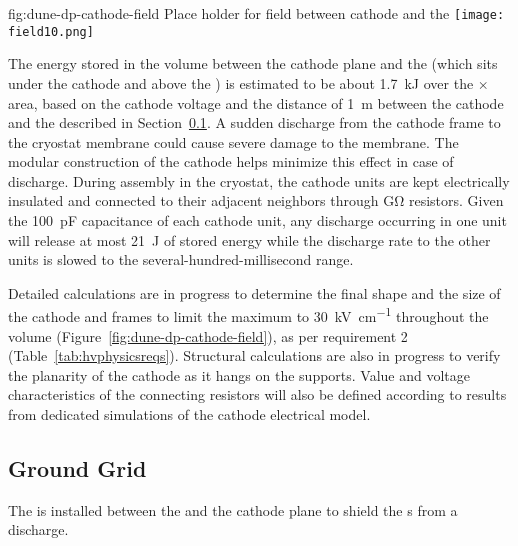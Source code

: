 \begin{dunefigure}{fig:dune-dp-cathode-field}
{Place holder for field between cathode and the } 
\texttt{[image: field10.png]}
\end{dunefigure}
The energy stored in the volume between the cathode plane and the  (which sits under the cathode and above the ) is estimated to be about \SI{1.7}{\kilo\joule} over the \dptpcwdth $\times$ \dptpclen area, based on the cathode voltage and the distance of \SI{1}{\m} between the cathode and the  described in Section~\ref{sec:dp-hv-groundgrid}. 
A sudden discharge from the cathode frame to the cryostat membrane could cause severe damage to the membrane.
The modular construction of the cathode helps minimize this effect in case of discharge. During assembly in the cryostat, the cathode units are kept electrically insulated and connected to their adjacent neighbors through \si{\giga\ohm}  
resistors. Given the \SI{100}{\pico\farad} capacitance of each cathode unit, any discharge occurring in one unit will release at most 
\SI{21}{\joule} of stored energy while the discharge rate  
to the other units is slowed to the several-hundred-millisecond range.

Detailed calculations are in progress to determine the final shape and the size of the cathode and  frames to %
limit the maximum \efield to \SI{30}{\kV\per\cm}  
throughout the \lar volume (Figure~\ref{fig:dune-dp-cathode-field}), as per requirement 2 (Table~\ref{tab:hvphysicsreqs}).  Structural calculations are also in progress to verify the planarity of the cathode as it hangs on the  supports.
Value and voltage characteristics of the connecting resistors will also be defined according to results from dedicated simulations of the cathode electrical model.


\subsection{Ground Grid}
\label{sec:dp-hv-groundgrid}
The  is installed between the  and the cathode plane to shield the \pmt{}s from a discharge.  

